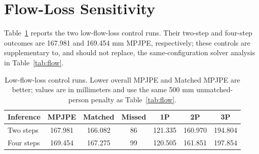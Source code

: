 \documentclass[conference,onecolumn]{IEEEtran}
\begin{document}


\FloatBarrier
\section{Flow-Loss Sensitivity}
\label{app:flow-control}
Table~\ref{tab:flow-control} reports the two low-flow-loss control runs. Their two-step and four-step outcomes are 167.981 and 169.454 mm MPJPE, respectively; these controls are supplementary to, and should not replace, the same-configuration solver analysis in Table~\ref{tab:flow}.

\begin{table}[!ht]
\centering
\caption{Low-flow-loss control runs. Lower overall MPJPE and Matched MPJPE are better; values are in millimeters and use the same 500 mm unmatched-person penalty as Table~\ref{tab:flow}.}
\label{tab:flow-control}
\begin{tabular}{l c c c c c c}
\toprule
Inference & MPJPE & Matched & Missed & 1P & 2P & 3P \\
\midrule
Two steps & 167.981 & 166.082 & 86 & 121.335 & 160.970 & 194.804 \\
Four steps & 169.454 & 167.275 & 99 & 120.505 & 161.851 & 197.854 \\
\bottomrule
\end{tabular}
\end{table}

\FloatBarrier


\end{document}
